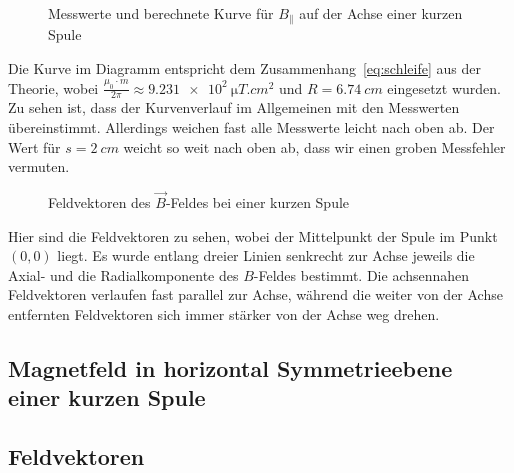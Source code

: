 \begin{figure}[H]
\centering
{}
\caption{Messwerte und berechnete Kurve für $B_\parallel$ auf der Achse einer kurzen Spule}
\label{fig:axialaufachsekurz}
\end{figure}

Die Kurve im Diagramm entspricht dem Zusammenhang~\cref{eq:schleife} aus der Theorie, wobei $\frac{\mu_0\cdot m}{2\pi}\approx \SI{9.231e2}{\micro T.cm^2}$ und $R=\SI{6.74}{cm}$ eingesetzt wurden.
Zu sehen ist, dass der Kurvenverlauf im Allgemeinen mit den Messwerten übereinstimmt. Allerdings weichen fast alle Messwerte leicht nach oben ab. Der Wert für $s=\SI{2}{cm}$ weicht so weit nach oben ab, dass wir einen groben Messfehler vermuten.

\begin{figure}[H]
  \centering

\caption{Feldvektoren des $\vec{B}$-Feldes bei einer kurzen Spule}
\end{figure}
Hier sind die Feldvektoren zu sehen, wobei der Mittelpunkt der Spule im Punkt $(0,0)$ liegt. Es wurde entlang dreier Linien senkrecht zur Achse jeweils die Axial- und die Radialkomponente des $B$-Feldes bestimmt. Die achsennahen Feldvektoren verlaufen fast parallel zur Achse, während die weiter von der Achse entfernten Feldvektoren sich immer stärker von der Achse weg drehen.
\subsection{Magnetfeld in horizontal Symmetrieebene einer kurzen Spule}

\subsection{Feldvektoren}


